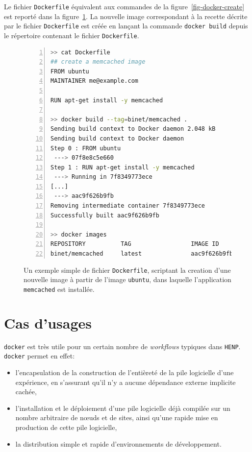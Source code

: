 \documentclass[a4paper]{article}
\begin{document}
Le fichier \texttt{Dockerfile} \'equivalent aux commandes de la
figure~\ref{fig-docker-create} est report\'e dans la
figure~\ref{fig-docker-dockerfile-create}.
La nouvelle image correspondant \`a la recette d\'ecrite par le fichier
\texttt{Dockerfile} est cr\'e\'ee en lan\c cant la commande
\texttt{docker~build} depuis le r\'epertoire contenant le fichier
\texttt{Dockerfile}.

\begin{figure}[h]
	\begin{lstlisting}[language=sh,
		basicstyle=\tiny,
		frame=trbl,
		numbers=left,
		showstringspaces=false,
	stringstyle=\ttfamily]
>> cat Dockerfile
## create a memcached image
FROM ubuntu
MAINTAINER me@example.com

RUN apt-get install -y memcached

>> docker build --tag=binet/memcached .
Sending build context to Docker daemon 2.048 kB
Sending build context to Docker daemon 
Step 0 : FROM ubuntu
 ---> 07f8e8c5e660
Step 1 : RUN apt-get install -y memcached
 ---> Running in 7f8349773ece
[...]
 ---> aac9f626b9fb
Removing intermediate container 7f8349773ece
Successfully built aac9f626b9fb

>> docker images
REPOSITORY          TAG                 IMAGE ID            CREATED              VIRTUAL SIZE
binet/memcached     latest              aac9f626b9fb        About a minute ago   190 MB
\end{lstlisting}
\caption{\label{fig-docker-dockerfile-create}Un exemple simple de fichier
	\texttt{Dockerfile}, scriptant la creation d'une nouvelle image \`a partir
	de l'image \texttt{ubuntu}, dans laquelle l'application \texttt{memcached}
est install\'ee.}
\end{figure}


\section*{Cas d'usages}

\texttt{docker} est tr\`es utile pour un certain nombre de \emph{workflows}
typiques dans \texttt{HENP}.
\texttt{docker} permet en effet:
\begin{itemize}
 \item l'encapsulation de la construction de l'enti\`eret\'e de la pile
	 logicielle d'une exp\'erience, en s'assurant qu'il n'y a aucune
	 d\'ependance externe implicite cach\'ee,
 \item l'installation et le d\'eploiement d'une pile logicielle d\'ej\`a
	 compil\'ee sur un nombre arbitraire de n\oe uds et de sites, ainsi qu'une
	 rapide mise en production de cette pile logicielle,
 \item la distribution simple et rapide d'environnements de d\'eveloppement.
\end{itemize}
\end{document}
